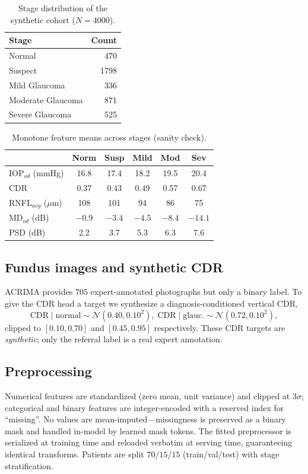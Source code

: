 \documentclass[10pt,twocolumn]{article}
\begin{document}
\begin{table}[t]
\centering
\caption{Stage distribution of the synthetic cohort ($N{=}4000$).}
\label{tab:classdist}
\small
\begin{tabular}{lr}
\toprule
Stage & Count \\
\midrule
Normal & 470 \\ Suspect & 1798 \\ Mild Glaucoma & 336 \\
Moderate Glaucoma & 871 \\ Severe Glaucoma & 525 \\
\bottomrule
\end{tabular}
\end{table}

\begin{table}[t]
\centering
\caption{Monotone feature means across stages (sanity check).}
\label{tab:monotone}
\small
\setlength{\tabcolsep}{4pt}
\begin{tabular}{lccccc}
\toprule
 & Norm & Susp & Mild & Mod & Sev \\
\midrule
IOP$_{od}$ (mmHg) & 16.8 & 17.4 & 18.2 & 19.5 & 20.4 \\
CDR & 0.37 & 0.43 & 0.49 & 0.57 & 0.67 \\
RNFL$_{avg}$ ($\mu$m) & 108 & 101 & 94 & 86 & 75 \\
MD$_{od}$ (dB) & $-0.9$ & $-3.4$ & $-4.5$ & $-8.4$ & $-14.1$ \\
PSD (dB) & 2.2 & 3.7 & 5.3 & 6.3 & 7.6 \\
\bottomrule
\end{tabular}
\end{table}

\subsection{Fundus images and synthetic CDR}
ACRIMA provides $705$ expert-annotated photographs but only a binary label. To give
the CDR head a target we synthesize a diagnosis-conditioned vertical CDR,
\begin{equation}
\mathrm{CDR}\mid\text{normal}\!\sim\!\mathcal{N}(0.40,0.10^2),\;
\mathrm{CDR}\mid\text{glauc.}\!\sim\!\mathcal{N}(0.72,0.10^2),
\end{equation}
clipped to $[0.10,0.70]$ and $[0.45,0.95]$ respectively. These CDR targets are
\emph{synthetic}; only the referral label is a real expert annotation.

\subsection{Preprocessing}
Numerical features are standardized (zero mean, unit variance) and clipped at
$3\sigma$; categorical and binary features are integer-encoded with a reserved index
for ``missing''. No values are mean-imputed---missingness is preserved as a binary
mask and handled in-model by learned mask tokens. The fitted preprocessor is
serialized at training time and reloaded verbatim at serving time, guaranteeing
identical transforms. Patients are split $70/15/15$ (train/val/test) with stage
stratification.
\end{document}
